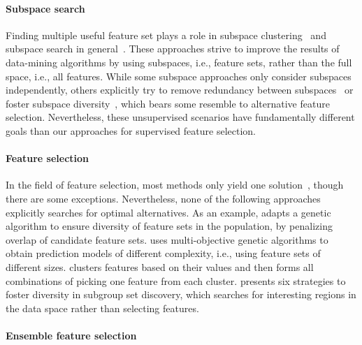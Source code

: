 \documentclass[conference]{IEEEtran}
\theoremstyle{definition}
\begin{document}
\paragraph{Subspace search}

Finding multiple useful feature set plays a role in subspace clustering~\cite{mueller2009relevant, guan2011unified, hu2018subspace} and subspace search in general~\cite{nguyen20134s, trittenbach2019dimension, fouche2021efficient}.
These approaches strive to improve the results of data-mining algorithms by using subspaces, i.e., feature sets, rather than the full space, i.e., all features.
While some subspace approaches only consider subspaces independently, others explicitly try to remove redundancy between subspaces~\cite{mueller2009relevant, nguyen20134s} or foster subspace diversity~\cite{trittenbach2019dimension, fouche2021efficient}, which bears some resemble to alternative feature selection.
Nevertheless, these unsupervised scenarios have fundamentally different goals than our approaches for supervised feature selection.

\paragraph{Feature selection}

In the field of feature selection, most methods only yield one solution~\cite{borboudakis2021extending}, though there are some exceptions.
Nevertheless, none of the following approaches explicitly searches for optimal alternatives.
As an example, \cite{siddiqi2020genetic} adapts a genetic algorithm to ensure diversity of feature sets in the population, by penalizing overlap of candidate feature sets.
\cite{emmanouilidis1999selecting} uses multi-objective genetic algorithms to obtain prediction models of different complexity, i.e., using feature sets of different sizes.
\cite{mueller2021feature} clusters features based on their values and then forms all combinations of picking one feature from each cluster.
\cite{leeuwen2012diverse} presents six strategies to foster diversity in subgroup set discovery, which searches for interesting regions in the data space rather than selecting features.

\paragraph{Ensemble feature selection}
\end{document}
